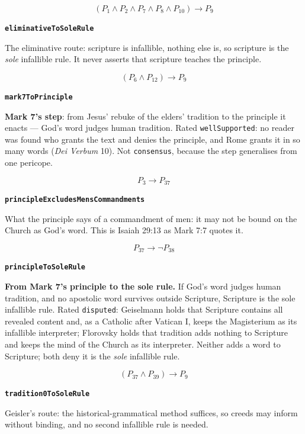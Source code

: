 \documentclass[11pt]{article}
\begin{document}
\[(P_{1} \land P_{2} \land P_{7} \land P_{8} \land P_{10}) \rightarrow P_{9}\]
\par\medskip\noindent\textbf{\texttt{eliminative\allowbreak{}To\allowbreak{}Sole\allowbreak{}Rule}}\par\nobreak\noindent
The eliminative route: scripture is infallible, nothing else is, so scripture is the \emph{sole} infallible rule. It never asserts that scripture teaches the principle.

\[(P_{6} \land P_{12}) \rightarrow P_{9}\]
\par\medskip\noindent\textbf{\texttt{mark7\allowbreak{}To\allowbreak{}Principle}}\par\nobreak\noindent
\textbf{Mark 7's step}: from Jesus' rebuke of the elders' tradition to the principle it enacts — God's word judges human tradition. Rated \texttt{well\allowbreak{}Supported}: no reader was found who grants the text and denies the principle, and Rome grants it in so many words (\emph{Dei Verbum} 10). Not \texttt{consensus}, because the step generalises from one pericope.

\[P_{3} \rightarrow P_{37}\]
\par\medskip\noindent\textbf{\texttt{principle\allowbreak{}Excludes\allowbreak{}Mens\allowbreak{}Commandments}}\par\nobreak\noindent
What the principle says of a commandment of men: it may not be bound on the Church as God's word. This is Isaiah 29:13 as Mark 7:7 quotes it.

\[P_{37} \rightarrow \lnot P_{38}\]
\par\medskip\noindent\textbf{\texttt{principle\allowbreak{}To\allowbreak{}Sole\allowbreak{}Rule}}\par\nobreak\noindent
\textbf{From Mark 7's principle to the sole rule.} If God's word judges human tradition, and no apostolic word survives outside Scripture, Scripture is the sole infallible rule. Rated \texttt{disputed}: Geiselmann holds that Scripture contains all revealed content and, as a Catholic after Vatican I, keeps the Magisterium as its infallible interpreter; Florovsky holds that tradition adds nothing to Scripture and keeps the mind of the Church as its interpreter. Neither adds a word to Scripture; both deny it is the \emph{sole} infallible rule.

\[(P_{37} \land P_{39}) \rightarrow P_{9}\]
\par\medskip\noindent\textbf{\texttt{tradition0\allowbreak{}To\allowbreak{}Sole\allowbreak{}Rule}}\par\nobreak\noindent
Geisler's route: the historical-grammatical method suffices, so creeds may inform without binding, and no second infallible rule is needed.
\end{document}
